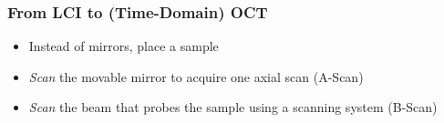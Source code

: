 \begin{frame}
    \frametitle{From LCI to (Time-Domain) OCT}
    \begin{itemize}
        \item<2-> Instead of mirrors, place a sample
        \item<3-> \emph{Scan} the movable mirror to acquire one axial scan (A-Scan)
        \item<4-> \emph{Scan} the beam that probes the sample using a scanning system (B-Scan)
    \end{itemize}

    \centering{}

\end{frame}

